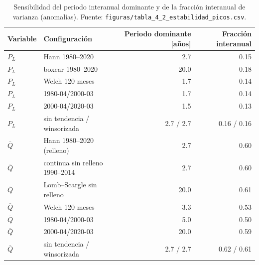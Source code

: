 \documentclass[11pt,letterpaper]{article}
\begin{document}
\begin{table}[H]
\centering\small
\caption{Sensibilidad del periodo interanual dominante y de la fracción interanual de varianza (anomalías).
Fuente: \texttt{figuras/tabla\_4\_2\_estabilidad\_picos.csv}.}
\label{tab:estab}
\begin{tabular}{llrr}
\toprule
Variable & Configuración & Periodo dominante [años] & Fracción interanual \\
\midrule
$P_L$ & Hann 1980--2020 & 2.7 & 0.15 \\
$P_L$ & boxcar 1980--2020 & 20.0 & 0.18 \\
$P_L$ & Welch 120 meses & 1.7 & 0.14 \\
$P_L$ & 1980-04/2000-03 & 1.7 & 0.14 \\
$P_L$ & 2000-04/2020-03 & 1.5 & 0.13 \\
$P_L$ & sin tendencia / winsorizada & 2.7 / 2.7 & 0.16 / 0.16 \\
$\overline{Q}$ & Hann 1980--2020 (relleno) & 2.7 & 0.60 \\
$\overline{Q}$ & continua sin relleno 1990--2014 & 2.7 & 0.60 \\
$\overline{Q}$ & Lomb--Scargle sin relleno & 20.0 & 0.61 \\
$\overline{Q}$ & Welch 120 meses & 3.3 & 0.53 \\
$\overline{Q}$ & 1980-04/2000-03 & 5.0 & 0.50 \\
$\overline{Q}$ & 2000-04/2020-03 & 20.0 & 0.59 \\
$\overline{Q}$ & sin tendencia / winsorizada & 2.7 / 2.7 & 0.62 / 0.61 \\
\bottomrule
\end{tabular}
\end{table}
\end{document}
